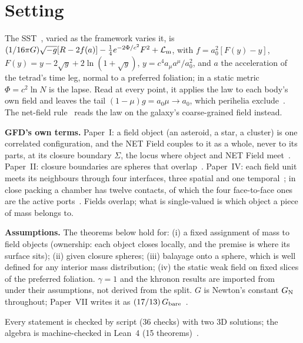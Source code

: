 \documentclass[twocolumn]{iopjournal}
\begin{document}


\section*{Setting}

The SST~\cite{NelsonTL}, varied as the framework varies it, is
$(1/16\pi G)\sqrt{-g}[R - 2f(a)] - \tfrac14e^{-2\Phi/c^2}F^2 +
\mathcal L_{\rm m}$, with $f = a_0^2[F(y) - y]$,
$F(y) = y - 2\sqrt y + 2\ln(1+\sqrt y)$, $y = c^4a_\mu a^\mu/a_0^2$, and
$a$ the acceleration of the tetrad's time leg, normal to a preferred
foliation; in a static metric $\Phi = c^2\ln N$ is the lapse. Read at
every point, it applies the law to each body's own field and leaves the
tail $(1-\mu)g = a_0\mu \to a_0$, which perihelia
exclude~\cite{NelsonTL,NelsonKh}. The net-field rule~\cite{NelsonNFR}
reads the law on the galaxy's coarse-grained field instead.

\textbf{GFD's own terms.} Paper~I: a field object (an asteroid, a star,
a cluster) is one correlated configuration, and the NET Field couples
to it as a whole, never to its parts, at its closure boundary $\Sigma$,
the locus where object and NET Field meet~\cite{NelsonI}. Paper~II:
closure boundaries are spheres that overlap~\cite{NelsonII}. Paper~IV:
each field unit meets its neighbours through four interfaces, three
spatial and one temporal~\cite{NelsonIV}; in close packing a chamber has
twelve contacts, of which the four face-to-face ones are the active
ports~\cite{NelsonFace}. Fields overlap; what is single-valued is which
object a piece of mass belongs to.

\textbf{Assumptions.} The theorems below hold for: (i) a fixed
assignment of mass to field objects (ownership: each object closes
locally, and the premise is where its surface sits);
(ii) given closure spheres; (iii) balayage onto a sphere, which is
well defined for any interior mass distribution; (iv) the static weak
field on fixed slices of the preferred foliation. $\gamma = 1$ and the
khronon results are imported from~\cite{NelsonTL,NelsonKh} under their
assumptions, not derived from the split. $G$ is Newton's
constant $G_{\rm N}$ throughout; Paper~VII writes it as
$(17/13)\,G_{\rm bare}$~\cite{NelsonVII}.

Every statement is checked by script (36 checks) with two 3D solutions;
the algebra is machine-checked in Lean~4 (15 theorems)~\cite{NelsonScript}.
\end{document}
